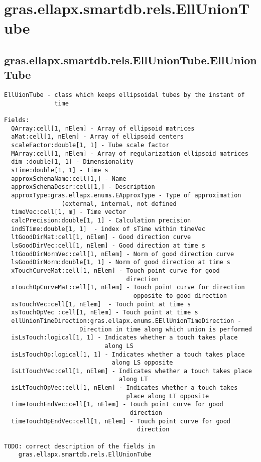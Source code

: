 \section{gras.ellapx.smartdb.rels.EllUnionTube}\label{secClassDescr:gras.ellapx.smartdb.rels.EllUnionTube}
\subsection{\texorpdfstring{gras.ellapx.smartdb.rels.EllUnionTube.EllUnionTube}{EllUnionTube}}\label{method:gras.ellapx.smartdb.rels.EllUnionTube.EllUnionTube}
\begin{verbatim}
EllUionTube - class which keeps ellipsoidal tubes by the instant of
              time

Fields:
  QArray:cell[1, nElem] - Array of ellipsoid matrices
  aMat:cell[1, nElem] - Array of ellipsoid centers
  scaleFactor:double[1, 1] - Tube scale factor
  MArray:cell[1, nElem] - Array of regularization ellipsoid matrices
  dim :double[1, 1] - Dimensionality
  sTime:double[1, 1] - Time s
  approxSchemaName:cell[1,] - Name
  approxSchemaDescr:cell[1,] - Description
  approxType:gras.ellapx.enums.EApproxType - Type of approximation
                (external, internal, not defined
  timeVec:cell[1, m] - Time vector
  calcPrecision:double[1, 1] - Calculation precision
  indSTime:double[1, 1]  - index of sTime within timeVec
  ltGoodDirMat:cell[1, nElem] - Good direction curve
  lsGoodDirVec:cell[1, nElem] - Good direction at time s
  ltGoodDirNormVec:cell[1, nElem] - Norm of good direction curve
  lsGoodDirNorm:double[1, 1] - Norm of good direction at time s
  xTouchCurveMat:cell[1, nElem] - Touch point curve for good
                                  direction
  xTouchOpCurveMat:cell[1, nElem] - Touch point curve for direction
                                    opposite to good direction
  xsTouchVec:cell[1, nElem]  - Touch point at time s
  xsTouchOpVec :cell[1, nElem] - Touch point at time s
  ellUnionTimeDirection:gras.ellapx.enums.EEllUnionTimeDirection -
                     Direction in time along which union is performed
  isLsTouch:logical[1, 1] - Indicates whether a touch takes place
                            along LS
  isLsTouchOp:logical[1, 1] - Indicates whether a touch takes place
                              along LS opposite
  isLtTouchVec:cell[1, nElem] - Indicates whether a touch takes place
                                along LT
  isLtTouchOpVec:cell[1, nElem] - Indicates whether a touch takes
                                  place along LT opposite
  timeTouchEndVec:cell[1, nElem] - Touch point curve for good
                                   direction
  timeTouchOpEndVec:cell[1, nElem] - Touch point curve for good
                                     direction

TODO: correct description of the fields in
    gras.ellapx.smartdb.rels.EllUnionTube
\end{verbatim}


